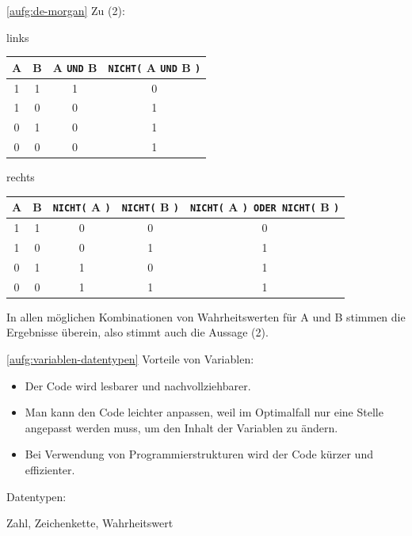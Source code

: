 \begin{loesung}{\ref{aufg:de-morgan}}
	\bigskip
	Zu (2):\smallskip
	
	\begin{minipage}{0.4\textwidth}
		\scriptsize
		links\smallskip
		
		\begin{tabular}{c|c|c|c}
			A & B & A \texttt{UND} B & \texttt{NICHT(} A \texttt{UND} B \texttt{)} \\ \hline
			1 & 1 & 1 		 & 0 \\ \hline
			1 & 0 & 0 		 & 1 \\ \hline
			0 & 1 & 0 		 & 1 \\ \hline
			0 & 0 & 0 		 & 1 \\
		\end{tabular}
	\end{minipage}
	\hfill
	\begin{minipage}{0.58\textwidth}
		\scriptsize
		rechts\smallskip
		
		\begin{tabular}{c|c|c|c|c}
			A & B & \texttt{NICHT(} A \texttt{)} & \texttt{NICHT(} B \texttt{)} & \texttt{NICHT(} A \texttt{) ODER NICHT(} B \texttt{)} \\ \hline
			1 & 1 & 0 		   & 0          & 0 \\ \hline
			1 & 0 & 0 		   & 1          & 1 \\ \hline
			0 & 1 & 1 		   & 0          & 1 \\ \hline
			0 & 0 & 1 		   & 1          & 1 \\ 
		\end{tabular}			
	\end{minipage}
	
	In allen möglichen Kombinationen von Wahrheitswerten für A und B stimmen die Ergebnisse überein, also stimmt auch die Aussage (2).
\end{loesung}

\begin{loesung}{\ref{aufg:variablen-datentypen}}
	Vorteile von Variablen:
	
	\begin{itemize}
		\item Der Code wird lesbarer und nachvollziehbarer.
		\item Man kann den Code leichter anpassen, weil im Optimalfall nur eine Stelle angepasst werden muss, um den Inhalt der Variablen zu ändern.
		\item Bei Verwendung von Programmierstrukturen wird der Code kürzer und effizienter.
	\end{itemize}
	
	Datentypen:
	
	Zahl, Zeichenkette, Wahrheitswert
\end{loesung}

